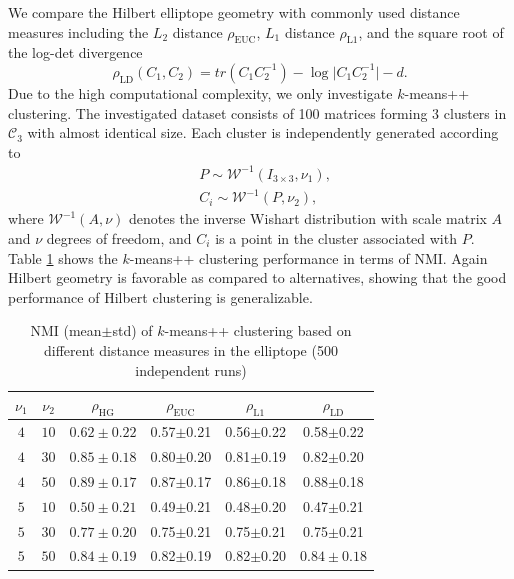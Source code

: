 \documentclass[graybox]{svmult}
\begin{document}
We compare the Hilbert elliptope geometry with commonly used distance measures
including the $L_2$ distance $\rho_{\mathrm{EUC}}$, $L_1$ distance $\rho_{\mathrm{L1}}$,
and the square root of the log-det divergence
$$
\rho_{\mathrm{LD}}(C_1,C_2) = tr(C_1C_2^{-1}) - \log\vert{}C_1C_2^{-1}\vert - d.
$$
Due to the high computational complexity, we only investigate $k$-means++ clustering.
The investigated dataset consists of 100 matrices forming 3 clusters in $\mathcal{C}_3$ with
almost identical size.  Each cluster is independently generated according to
\begin{align}
&P\sim \mathcal{W}^{-1}(I_{3\times{3}}, \nu_1),\nonumber\\
&C_i\sim \mathcal{W}^{-1}(P,\nu_2),\nonumber
\end{align}
where $\mathcal{W}^{-1}(A,\nu)$ denotes the inverse Wishart distribution with
scale matrix $A$ and $\nu$ degrees of freedom, and $C_i$ is a point in the cluster
associated with $P$.
Table \ref{tbl:elliptope} shows the $k$-means++ clustering performance in terms of NMI.
Again Hilbert geometry is favorable as compared to alternatives, showing
that the good performance of Hilbert clustering is generalizable.
\begin{table}[t]
\centering
\caption{NMI (mean$\pm$std) of $k$-means++ clustering based on different distance measures in the elliptope
(500 independent runs)}
\label{tbl:elliptope}
\begin{tabular}{cc|cccc}
\toprule[1.5pt]
$\nu_1$ & $\nu_2$    &  $\rho_{\mathrm{HG}}$ & $\rho_{\mathrm{EUC}}$ & $\rho_{\mathrm{L1}}$ & $\rho_{\mathrm{LD}}$ \\
\hline
$4$ & $10$ &  $\bm{0.62\pm0.22}$ & 0.57$\pm$0.21 & 0.56$\pm$0.22 & 0.58$\pm$0.22\\
$4$ & $30$ &  $\bm{0.85\pm0.18}$ & 0.80$\pm$0.20 & 0.81$\pm$0.19 & 0.82$\pm$0.20\\
$4$ & $50$ &  $\bm{0.89\pm0.17}$ & 0.87$\pm$0.17 & 0.86$\pm$0.18 & 0.88$\pm$0.18\\
\hline
$5$ & $10$ &  $\bm{0.50\pm0.21}$ & 0.49$\pm$0.21 & 0.48$\pm$0.20 & 0.47$\pm$0.21\\
$5$ & $30$ &  $\bm{0.77\pm0.20}$ & 0.75$\pm$0.21 & 0.75$\pm$0.21 & 0.75$\pm$0.21\\
$5$ & $50$ &  $\bm{0.84\pm0.19}$ & 0.82$\pm$0.19 & 0.82$\pm$0.20 & $\bm{0.84\pm0.18}$\\
\bottomrule[1.5pt]
\end{tabular}
\end{table}
\end{document}
